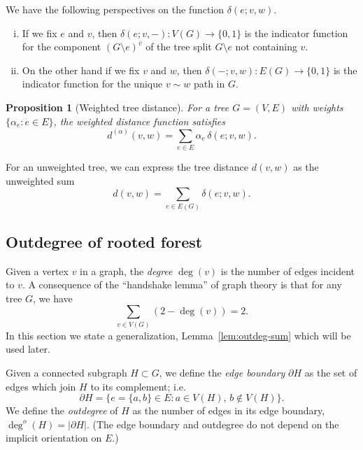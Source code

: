 \documentclass{amsart}
\newtheorem{prop}[thm]{Proposition}
\theoremstyle{definition}
\newcommand{\degout}{\deg^o}
\begin{document}
We have the following perspectives on the function $\delta(e; v,w)$.
\begin{enumerate}[(i)]
\item 
If we fix $e$ and $v$,
then $\delta(e;v, -) : V(G) \to \{0,1\}$ 
is the indicator function for the component 
$(G \setminus e)^{\overline v}$ of the tree split $G \setminus e$
not containing $v$.

\item 
On the other hand if we fix $v$ and $w$, then $\delta(-;v,w) : E(G) \to \{0,1\}$
is the indicator function for the unique $v \sim w$ path in $G$.

\end{enumerate}


\begin{prop}[Weighted tree distance]
\label{prop:distance-sum}
For a tree $G = (V,E)$ with weights $\{\alpha_e : e \in E\}$,
the weighted distance function satisfies
\[ 
d^{(\alpha)}(v,w) = \sum_{e \in E} \alpha_e \, \delta(e; v,w) .
\]
\end{prop}

For an unweighted tree, we can express the tree distance $d(v,w)$ as the unweighted sum
\begin{equation*}
	d(v,w) = \sum_{e \in E(G)} \delta(e; v,w).
\end{equation*}


\subsection{Outdegree of rooted forest}
\label{sec:outdegree}

Given a vertex $v$ in a graph, the {\em degree} $\deg(v)$ is the number of edges incident to $v$.
A consequence of the ``handshake lemma'' of graph theory is that for any tree $G$, we have
\begin{equation}
\label{eq:handshake}
	\sum_{v \in V(G)} (2 - \deg(v)) = 2.
\end{equation}
In this section we state a generalization, Lemma~\ref{lem:outdeg-sum} which will be used later.

Given a connected subgraph $H \subset G$,
we define the {\em edge boundary}  $\partial H$ as the set of edges which join $H$ to its complement; i.e.
\begin{equation}
	\partial H = \{ e = \{a,b\} \in E : a \in V(H),\, b \not\in V(H)\}.
\end{equation}
We define the {\em outdegree} of $H$ as the number of edges in its edge boundary, $\degout(H) = |\partial H|$. 
(The edge boundary and outdegree do not depend on the implicit orientation on $E$.)
\end{document}
